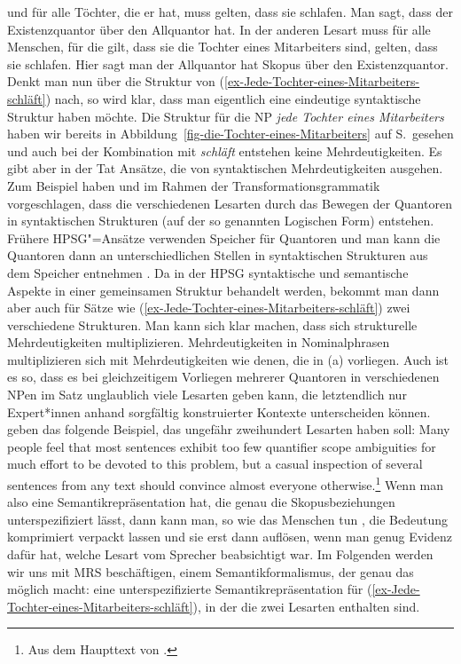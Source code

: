 und für alle Töchter, die er hat, muss gelten, dass sie schlafen. Man sagt, dass der Existenzquantor
 über den Allquantor hat. In der anderen Lesart muss für alle
Menschen, für die gilt, dass sie die Tochter eines Mitarbeiters sind, gelten, dass sie
schlafen. Hier sagt man der Allquantor hat Skopus über den Existenzquantor. Denkt man nun über die
Struktur von (\ref{ex-Jede-Tochter-eines-Mitarbeiters-schläft}) nach, so wird klar, dass man eigentlich eine eindeutige syntaktische
Struktur haben möchte. Die Struktur für die NP \emph{jede Tochter eines Mitarbeiters} haben wir
bereits in Abbildung~\ref{fig-die-Tochter-eines-Mitarbeiters} auf
S.\,\pageref{fig-die-Tochter-eines-Mitarbeiters} gesehen und auch bei der Kombination mit
\emph{schläft} entstehen keine Mehrdeutigkeiten. Es gibt aber in der Tat Ansätze, die
von syntaktischen Mehrdeutigkeiten ausgehen. Zum Beispiel haben \citet{Chomsky76a-u} und
\citet{May77a-u,May85a-u} im Rahmen der Transformationsgrammatik \citep{Chomsky57a,Chomsky81a} vorgeschlagen, dass die verschiedenen Lesarten durch das Bewegen der Quantoren in
syntaktischen Strukturen (auf der so genannten Logischen Form) entstehen. Frühere HPSG"=Ansätze
verwenden Speicher für Quantoren und man kann die Quantoren dann an unterschiedlichen Stellen in
syntaktischen Strukturen aus dem Speicher entnehmen \parencites{Cooper83}[Kapitel~8]{ps2}. Da in der
HPSG syntaktische und semantische Aspekte in einer gemeinsamen Struktur behandelt werden, bekommt
man dann aber auch für Sätze wie (\ref{ex-Jede-Tochter-eines-Mitarbeiters-schläft}) zwei verschiedene Strukturen. Man kann sich klar machen, dass sich strukturelle
Mehrdeutigkeiten multiplizieren. Mehrdeutigkeiten in Nominalphrasen multiplizieren sich mit
Mehrdeutigkeiten wie denen, die in (a) vorliegen. Auch ist es so, dass es bei gleichzeitigem
Vorliegen mehrerer Quantoren in verschiedenen NPen im Satz unglaublich viele Lesarten geben kann, die
letztendlich nur Expert*innen anhand sorgfältig konstruierter Kontexte unterscheiden
können. 
\citet[]{ADKMNT2003a} geben das folgende Beispiel, das ungefähr zweihundert Lesarten haben soll:
\ea
Many people feel that most sentences exhibit too few quantifier scope ambiguities for much effort to be devoted
to this problem, but a casual inspection of several sentences from any text should convince almost everyone
otherwise.\footnote{%
  Aus dem Haupttext von .
}
\z
Wenn
man also eine Semantikrepräsentation hat, die genau die Skopusbeziehungen unterspezifiziert lässt, dann kann
man, so wie das Menschen tun \citep{FBF2002a-u,Dwivedi2013a-u,Frances2024a-u}, 
die Bedeutung komprimiert verpackt lassen und sie erst dann
auflösen, wenn man genug Evidenz dafür hat, welche Lesart vom Sprecher beabsichtigt war.
Im Folgenden werden wir uns mit MRS beschäftigen, einem Semantikformalismus, der genau das möglich
macht: eine unterspezifizierte Semantikrepräsentation für (\ref{ex-Jede-Tochter-eines-Mitarbeiters-schläft}), in der die zwei Lesarten
enthalten sind.

